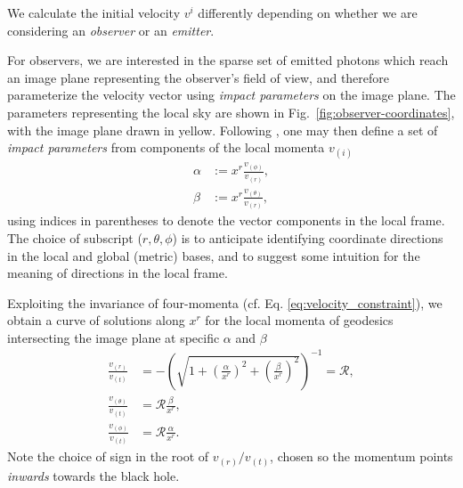 \documentclass[fleqn,usenatbib]{mnras}
\begin{document}
We calculate the initial velocity $v^i$ differently depending on whether we are
considering an \emph{observer} or an \emph{emitter}.

For observers, we are interested in the sparse set of emitted photons which
reach an image plane representing the observer's field of view, and therefore
parameterize the velocity vector using \emph{impact parameters} on the image
plane. The parameters representing the local sky are shown in
Fig.~\ref{fig:observer-coordinates}, with the image plane drawn in yellow.
Following \cite{cunningham_optical_1973}, one may then define a set of
\emph{impact
parameters} from components of the local momenta $v_{(i)}$
\begin{align}
    \alpha &:=  x^r \frac{v_{(\phi)}}{v_{(r)}}, \\
    \beta &:= x^r \frac{v_{(\theta)}}{v_{(r)}},
\end{align}
using indices in parentheses to denote the vector components in the local
frame. The choice of subscript ($r, \theta, \phi$) is to anticipate identifying
coordinate directions in the local and global (metric) bases, and to suggest
some intuition for the meaning of directions in the local frame.

Exploiting the invariance of four-momenta (cf. Eq.
\eqref{eq:velocity_constraint}), we obtain a curve of solutions along $x^r$ for
the local momenta of geodesics intersecting the image plane at specific
$\alpha$ and
$\beta$
\begin{align}
    \frac{v_{(r)}}{v_{(t)}} &= -\left( \sqrt{1 + \left(\frac{\alpha}{x^r}\right)^2 + \left(\frac{\beta}{x^r}\right)^2} \right)^{-1} = \mathscr{R}, \\
    \frac{v_{(\theta)}}{v_{(t)}} &= \mathscr{R} \frac{\beta}{x^r}, \\
    \frac{v_{(\phi)}}{v_{(t)}} &= \mathscr{R} \frac{\alpha}{x^r}.
\end{align}
Note the choice of sign in the root of $v_{(r)} / v_{(t)}$, chosen so the
momentum points \emph{inwards} towards the black hole.
\end{document}
